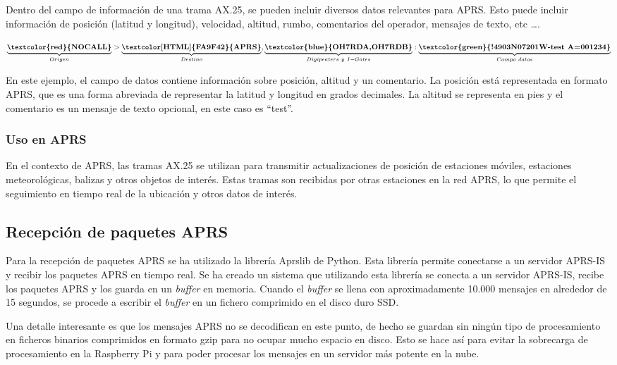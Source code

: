 Dentro del campo de información de una trama AX.25, se pueden incluir diversos datos relevantes para APRS. Esto puede incluir información de posición (latitud y longitud), velocidad, altitud, rumbo, comentarios del operador, mensajes de texto, etc \ldots \cite{APRSPaths}\cite{APRS}.

\[\underbrace{\textbf{\textcolor{red}{NOCALL}}}_{Origen}>\underbrace{\textbf{\textcolor[HTML]{FA9F42}{APRS}}}_{Destino}, \underbrace{\textbf{\textcolor{blue}{OH7RDA,OH7RDB}}}_{Digipeaters\ y\ I-Gates}:\underbrace{\textbf{\textcolor{green}{!4903N07201W-test A=001234}}}_{Campo\ datos}\]

En este ejemplo, el campo de datos contiene información sobre posición, altitud y un comentario. La posición está representada en formato APRS, que es una forma abreviada de representar la latitud y longitud en grados decimales. La altitud se representa en pies y el comentario es un mensaje de texto opcional, en este caso es ``test''.

\subsubsection*{Uso en APRS}

En el contexto de APRS, las tramas AX.25 se utilizan para transmitir actualizaciones de posición de estaciones móviles, estaciones meteorológicas, balizas y otros objetos de interés. Estas tramas son recibidas por otras estaciones en la red APRS, lo que permite el seguimiento en tiempo real de la ubicación y otros datos de interés.

\subsection{Recepción de paquetes APRS}

Para la recepción de paquetes APRS se ha utilizado la librería Aprslib de Python. Esta librería permite conectarse a un servidor APRS-IS y recibir los paquetes APRS en tiempo real. Se ha creado un sistema que utilizando esta librería se conecta a un servidor APRS-IS, recibe los paquetes APRS y los guarda en un \textit{buffer} en memoria. Cuando el \textit{buffer} se llena con aproximadamente 10.000 mensajes en alrededor de 15 segundos, se procede a escribir el \textit{buffer} en un fichero comprimido en el disco duro SSD.

Una detalle interesante es que los mensajes APRS no se decodifican en este punto, de hecho se guardan sin ningún tipo de procesamiento en ficheros binarios comprimidos en formato gzip para no ocupar mucho espacio en disco. Esto se hace así para evitar la sobrecarga de procesamiento en la Raspberry Pi y para poder procesar los mensajes en un servidor más potente en la nube.

